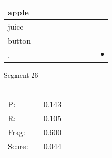 \documentclass[landscape]{article}
\newcommand{\ssp}{\hspace{2pt}}
\newcommand{\mex}{\cellcolor{g}$\bullet$}
\begin{document}
\begin{tabular}{|l|p{10pt}|p{10pt}|p{10pt}|p{10pt}|p{10pt}|p{10pt}|p{10pt}|p{10pt}|p{10pt}|}
\hline
\ssp apple \ssp&\hspace{2pt}&\hspace{2pt}&\hspace{2pt}&\hspace{2pt}&\hspace{2pt}&\hspace{2pt}&\hspace{2pt}&\hspace{2pt}&\hspace{2pt}\\
\hline
\ssp juice \ssp&\hspace{2pt}&\hspace{2pt}&\hspace{2pt}&\hspace{2pt}&\hspace{2pt}&\hspace{2pt}&\hspace{2pt}&\hspace{2pt}&\hspace{2pt}\\
\hline
\ssp button \ssp&\hspace{2pt}&\hspace{2pt}&\hspace{2pt}&\hspace{2pt}&\hspace{2pt}&\hspace{2pt}&\hspace{2pt}&\hspace{2pt}&\hspace{2pt}\\
\hline
\ssp \cellcolor{ref8}. \ssp&\hspace{2pt}&\hspace{2pt}&\hspace{2pt}&\hspace{2pt}&\hspace{2pt}&\hspace{2pt}&\hspace{2pt}&\hspace{2pt}&\hspace{2pt}\mex\\
\hline
\end{tabular}

\vspace{6pt}
\noindent Segment 26\\\\
\noindent\begin{tabular}{lm{12pt}r}
\hline
P:&&0.143\\
R:&&0.105\\
Frag:&&0.600\\
Score:&&0.044\\
\end{tabular}
\end{document}
